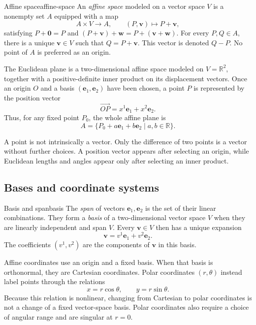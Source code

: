 \documentclass[11pt,a4paper]{article}
\newcommand{\vect}[1]{\bm{#1}}
\newcommand{\R}{\mathbb{R}}
\begin{document}
\begin{definition}{Affine space}{affine-space}
An \emph{affine space} modeled on a vector space \(V\) is a nonempty set
\(A\) equipped with a map
\[
  A\times V\longrightarrow A,\qquad (P,\vect v)\longmapsto P+\vect v,
\]
satisfying \(P+\vect{0}=P\) and
\((P+\vect v)+\vect w=P+(\vect v+\vect w)\). For every \(P,Q\in A\), there is
a unique \(\vect v\in V\) such that \(Q=P+\vect v\). This vector is denoted
\(Q-P\). No point of \(A\) is preferred as an origin.
\end{definition}

The Euclidean plane is a two-dimensional affine space modeled on \(V=\R^2\),
together with a positive-definite inner product on its displacement vectors.
Once an origin \(O\) and a basis \((\vect e_1,\vect e_2)\) have been chosen, a
point \(P\) is represented by the position vector
\[
  \overrightarrow{OP}=x^1\vect{e}_1+x^2\vect{e}_2.
\]
Thus, for any fixed point \(P_0\), the whole affine plane is
\[
  A=\{P_0+a\vect e_1+b\vect e_2\mid a,b\in\R\}.
\]

\begin{precision}
A point is not intrinsically a vector. Only the difference of two points is a
vector without further choices. A position vector appears after selecting an
origin, while Euclidean lengths and angles appear only after selecting an inner
product.
\end{precision}

\subsection{Bases and coordinate systems}

\begin{definition}{Basis and span}{basis}
The \emph{span} of vectors \(\vect e_1,\vect e_2\) is the set of their linear
combinations. They form a \emph{basis} of a two-dimensional vector space \(V\)
when they are linearly independent and span \(V\). Every \(\vect v\in V\) then
has a unique expansion
\[
  \vect{v}=v^1\vect{e}_1+v^2\vect{e}_2.
\]
The coefficients \((v^1,v^2)\) are the components of \(\vect v\) in this
basis.
\end{definition}

Affine coordinates use an origin and a fixed basis. When that basis is
orthonormal, they are Cartesian coordinates. Polar coordinates
\((r,\theta)\) instead label points through the relations
\[
  x=r\cos\theta,\qquad y=r\sin\theta.
\]
Because this relation is nonlinear, changing from Cartesian to polar
coordinates is not a change of a fixed vector-space basis. Polar coordinates
also require a choice of angular range and are singular at \(r=0\).
\end{document}
